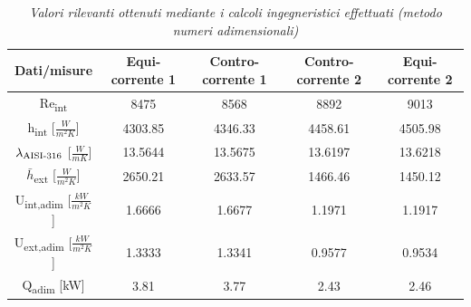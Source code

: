 \documentclass[a4paper,10pt]{article}                                                                                       %
\begin{document}
\begin{table}[H]                                                                                                            %
  \caption{\textit{Valori rilevanti ottenuti mediante i calcoli ingegneristici effettuati (metodo numeri adimensionali)}}   %
  \label{tab:adim_num_calcs}                                                                                                %
  \vspace{3mm}                                                                                                              %
  \centering                                                                                                                %
  \begin{tabular}{||c|c|c|c|c||}                                                                                            %
    \hline
    Dati/misure                                         & Equi-corrente 1 & Contro-corrente 1 & Contro-corrente 2 & Equi-corrente 2 \\
    \hline\hline
    Re\textsubscript{int}                               & 8475            & 8568              & 8892              & 9013            \\
    h\textsubscript{int} [$\frac{W}{m^{2}K}$]           & 4303.85         & 4346.33           & 4458.61           & 4505.98         \\
    $\lambda\textsubscript{AISI-316}$ [$\frac{W}{mK}$]  & 13.5644         & 13.5675           & 13.6197           & 13.6218         \\
    $\bar{h}$\textsubscript{ext} [$\frac{W}{m^{2}K}$]   & 2650.21         & 2633.57           & 1466.46           & 1450.12         \\
    U\textsubscript{int,adim} [$\frac{kW}{m^{2}K}$]     & 1.6666          & 1.6677            & 1.1971            & 1.1917          \\
    U\textsubscript{ext,adim} [$\frac{kW}{m^{2}K}$]     & 1.3333          & 1.3341            & 0.9577            & 0.9534          \\
    Q\textsubscript{adim} [kW]                          & 3.81            & 3.77              & 2.43              & 2.46            \\
    \hline
  \end{tabular}                                                                                                             %
\end{table}                                                                                                                 %
\end{document}
